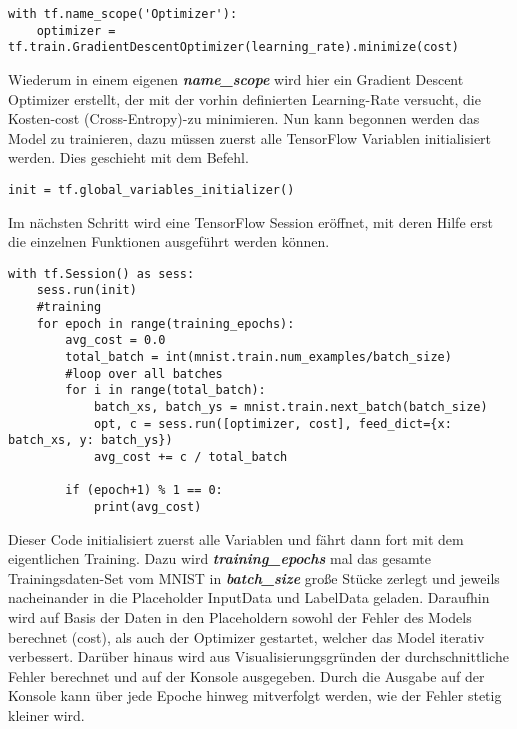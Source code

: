 \begin{lstlisting}
with tf.name_scope('Optimizer'):
    optimizer = tf.train.GradientDescentOptimizer(learning_rate).minimize(cost)
\end{lstlisting}


Wiederum in einem eigenen \textbf{\textit{name\_scope}} wird hier ein Gradient Descent Optimizer erstellt, der mit der vorhin definierten Learning-Rate versucht, die Kosten-cost (Cross-Entropy)-zu minimieren. Nun kann begonnen werden das Model zu trainieren, dazu müssen zuerst alle TensorFlow Variablen initialisiert werden. Dies geschieht mit dem Befehl.

\lstset{language=Python}

\begin{lstlisting}
init = tf.global_variables_initializer()
\end{lstlisting}


Im nächsten Schritt wird eine TensorFlow Session eröffnet, mit deren Hilfe erst die einzelnen Funktionen ausgeführt werden können.


\lstset{language=Python}

\begin{lstlisting}
with tf.Session() as sess:
    sess.run(init)
    #training
    for epoch in range(training_epochs):
        avg_cost = 0.0
        total_batch = int(mnist.train.num_examples/batch_size)
        #loop over all batches
        for i in range(total_batch):
            batch_xs, batch_ys = mnist.train.next_batch(batch_size)
            opt, c = sess.run([optimizer, cost], feed_dict={x: batch_xs, y: batch_ys})
            avg_cost += c / total_batch

        if (epoch+1) % 1 == 0:
            print(avg_cost)

\end{lstlisting}

Dieser Code initialisiert zuerst alle Variablen und fährt dann fort mit dem eigentlichen Training. Dazu wird \textbf{\textit{training\_epochs}} mal das gesamte Trainingsdaten-Set vom MNIST in \textbf{\textit{batch\_size}} große Stücke zerlegt und jeweils nacheinander in die Placeholder InputData und LabelData geladen. Daraufhin wird auf Basis der Daten in den Placeholdern sowohl der Fehler des Models berechnet (cost), als auch der Optimizer gestartet, welcher das Model iterativ verbessert. Darüber hinaus wird aus Visualisierungsgründen der durchschnittliche Fehler berechnet und auf der Konsole ausgegeben. Durch die Ausgabe auf der Konsole kann über jede Epoche hinweg mitverfolgt werden, wie der Fehler stetig kleiner wird.




\label{cha:Trainieren}